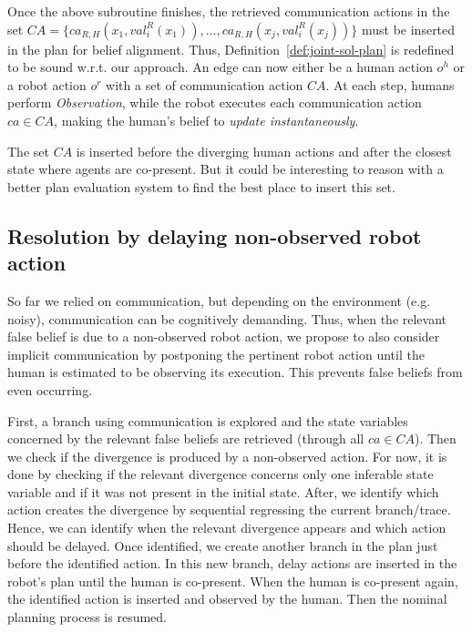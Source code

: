 Once the above subroutine finishes, the retrieved communication actions in the set $\mathit{CA} = \{ ca_{R, H}(x_1,val^R_i(x_1)),..., ca_{R, H}(x_j,val^R_i(x_j)) \}$ must be inserted in the plan for belief alignment. Thus, Definition~\ref{def:joint-sol-plan} is redefined to be sound w.r.t. our approach. An edge can now either be a human action $o^h$ or a robot action $o^r$ with a set of communication action $CA$.
At each step, humans perform \textit{Observation}, while the robot executes each communication action $ca \in \mathit{CA}$, making the human's belief to \textit{update instantaneously}.

The set $\mathit{CA}$ is inserted before the diverging human actions and after the closest state where agents are co-present. 
But it could be interesting to reason with a better plan evaluation system to find the best place to insert this set.

    \subsection{Resolution by delaying non-observed robot action}

So far we relied on communication, but depending on the environment (e.g. noisy), communication can be cognitively demanding. 
Thus, when the relevant false belief is due to a non-observed robot action, we propose to also consider implicit communication by postponing the pertinent robot action until the human is estimated to be observing its execution. 
This prevents false beliefs from even occurring.

First, a branch using communication is explored and the state variables concerned by the relevant false beliefs are retrieved (through all $ca \in CA$).
Then we check if the divergence is produced by a non-observed action. For now, it is done by checking if the relevant divergence concerns only one inferable state variable and if it was not present in the initial state.   
After, we identify which action creates the divergence by sequential regressing the current branch/trace. Hence, we can identify when the relevant divergence appears and which action should be delayed.
Once identified, we create another branch in the plan just before the identified action. In this new branch, {\sc delay} actions are inserted in the robot's plan until the human is co-present. When the human is co-present again, the identified action is inserted and observed by the human. Then the nominal planning process is resumed.  

